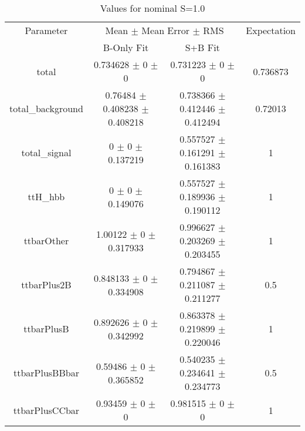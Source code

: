 \begin{table}
\centering
\caption{Values for nominal S=1.0}
\begin{tabular}{cccc}
\toprule
Parameter & \multicolumn{2}{c}{Mean $\pm$ Mean Error $\pm$ RMS} & Expectation\\
 & B-Only Fit & S+B Fit & \\
\midrule
total & \num{0.734628} $\pm$ \num{0} $\pm$ \num{0} & \num{0.731223} $\pm$ \num{0} $\pm$ \num{0} & \num{0.736873}\\
total\_background & \num{0.76484} $\pm$ \num{0.408238} $\pm$ \num{0.408218} & \num{0.738366} $\pm$ \num{0.412446} $\pm$ \num{0.412494} & \num{0.72013}\\
total\_signal & \num{0} $\pm$ \num{0} $\pm$ \num{0.137219} & \num{0.557527} $\pm$ \num{0.161291} $\pm$ \num{0.161383} & \num{1}\\
ttH\_hbb & \num{0} $\pm$ \num{0} $\pm$ \num{0.149076} & \num{0.557527} $\pm$ \num{0.189936} $\pm$ \num{0.190112} & \num{1}\\
ttbarOther & \num{1.00122} $\pm$ \num{0} $\pm$ \num{0.317933} & \num{0.996627} $\pm$ \num{0.203269} $\pm$ \num{0.203455} & \num{1}\\
ttbarPlus2B & \num{0.848133} $\pm$ \num{0} $\pm$ \num{0.334908} & \num{0.794867} $\pm$ \num{0.211087} $\pm$ \num{0.211277} & \num{0.5}\\
ttbarPlusB & \num{0.892626} $\pm$ \num{0} $\pm$ \num{0.342992} & \num{0.863378} $\pm$ \num{0.219899} $\pm$ \num{0.220046} & \num{1}\\
ttbarPlusBBbar & \num{0.59486} $\pm$ \num{0} $\pm$ \num{0.365852} & \num{0.540235} $\pm$ \num{0.234641} $\pm$ \num{0.234773} & \num{0.5}\\
ttbarPlusCCbar & \num{0.93459} $\pm$ \num{0} $\pm$ \num{0} & \num{0.981515} $\pm$ \num{0} $\pm$ \num{0} & \num{1}\\
\bottomrule
\end{tabular}
\end{table}